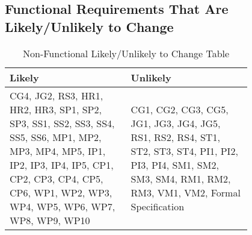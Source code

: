 \documentclass[12pt]{article}
\begin{document}
\subsection{Functional Requirements That Are Likely/Unlikely to Change}
\begin{table}[h]
    \centering
    \begin{tabular}{|p{0.40\linewidth} | p{0.40\linewidth}|}
    \hline
         Likely & Unlikely \\
         \hline
         CG4, JG2, RS3, HR1, HR2, HR3, SP1, SP2, SP3, SS1, SS2, SS3, SS4, SS5, SS6, MP1, MP2, MP3, MP4, MP5, IP1, IP2, IP3, IP4, IP5, CP1, CP2, CP3, CP4, CP5, CP6, WP1, WP2, WP3, WP4, WP5, WP6, WP7, WP8, WP9, WP10 & CG1, CG2, CG3, CG5, JG1, JG3, JG4, JG5, RS1, RS2, RS4, ST1, ST2, ST3, ST4, PI1, PI2, PI3, PI4, SM1, SM2, SM3, SM4, RM1, RM2, RM3, VM1, VM2, Formal Specification   \\
         \hline
    \end{tabular}
    \caption{Non-Functional Likely/Unlikely to Change Table}
    \label{tab:my_label2}
\end{table}
\end{document}
